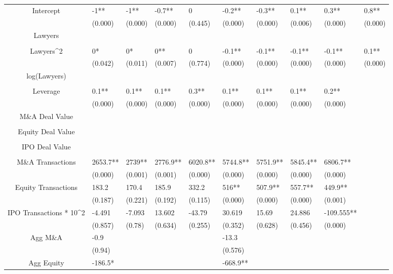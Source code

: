 \documentclass{article}
\begin{document}
\begin{table}[H]
\begin{tabular}{|clllllllll|}
Intercept & -1** & -1** & -0.7** & 0 & -0.2** & -0.3** & 0.1** & 0.3** & 0.8** \\ 
   & (0.000) & (0.000) & (0.000) & (0.445) & (0.000) & (0.000) & (0.006) & (0.000) & (0.000) \\ 
  Lawyers &  &  &  &  &  &  &  &  &  \\ 
   &  &  &  &  &  &  &  &  &  \\ 
  Lawyers^2 & 0* & 0* & 0** & 0 & -0.1** & -0.1** & -0.1** & -0.1** & 0.1** \\ 
   & (0.042) & (0.011) & (0.007) & (0.774) & (0.000) & (0.000) & (0.000) & (0.000) & (0.000) \\ 
  log(Lawyers) &  &  &  &  &  &  &  &  &  \\ 
   &  &  &  &  &  &  &  &  &  \\ 
  Leverage & 0.1** & 0.1** & 0.1** & 0.3** & 0.1** & 0.1** & 0.1** & 0.2** &  \\ 
   & (0.000) & (0.000) & (0.000) & (0.000) & (0.000) & (0.000) & (0.000) & (0.000) &  \\ 
  M\&A Deal Value &  &  &  &  &  &  &  &  &  \\ 
   &  &  &  &  &  &  &  &  &  \\ 
  Equity Deal Value &  &  &  &  &  &  &  &  &  \\ 
   &  &  &  &  &  &  &  &  &  \\ 
  IPO Deal Value &  &  &  &  &  &  &  &  &  \\ 
   &  &  &  &  &  &  &  &  &  \\ 
  M\&A Transactions & 2653.7** & 2739** & 2776.9** & 6020.8** & 5744.8** & 5751.9** & 5845.4** & 6806.7** &  \\ 
   & (0.000) & (0.001) & (0.001) & (0.000) & (0.000) & (0.000) & (0.000) & (0.000) &  \\ 
  Equity Transactions & 183.2 & 170.4 & 185.9 & 332.2 & 516** & 507.9** & 557.7** & 449.9** &  \\ 
   & (0.187) & (0.221) & (0.192) & (0.115) & (0.000) & (0.000) & (0.000) & (0.001) &  \\ 
  IPO Transactions * 10^2 & -4.491 & -7.093 & 13.602 & -43.79 & 30.619 & 15.69 & 24.886 & -109.555** &  \\ 
   & (0.857) & (0.78) & (0.634) & (0.255) & (0.352) & (0.628) & (0.456) & (0.000) &  \\ 
  Agg M\&A & -0.9 &  &  &  & -13.3 &  &  &  &  \\ 
   & (0.94) &  &  &  & (0.576) &  &  &  &  \\ 
  Agg Equity & -186.5* &  &  &  & -668.9** &  &  &  &  \\ 

\end{tabular}
\end{table}
\end{document}
